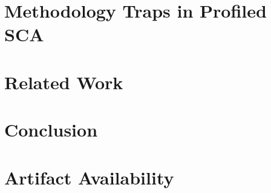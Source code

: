 \documentclass[a4paper,11pt,twocolumn]{article}
\newif\blackbox
\newif\demoonly
\newif\negativeonly
\begin{document}
\section{Methodology Traps in Profiled SCA}

\section{Related Work}

\section{Conclusion}

\section*{Artifact Availability}
\end{document}
